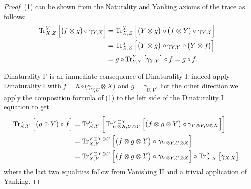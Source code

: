 \documentclass[12pt,oneside,article,draft]{memoir}
\begin{document}
\begin{proof}
 (1) can be shown from the Naturality and Yanking axioms of the trace as follows:
 \begin{align*}
  \operatorname{Tr}^Y_{X,Z}\Big[\big(f\otimes g\big)\circ\gamma_{Y,X}\Big]
  &=\operatorname{Tr}^Y_{X,Z}\Big[\big(Y\otimes g\big)\circ\big(f\otimes Y\big)\circ\gamma_{Y,X}\Big]\\
  &=\operatorname{Tr}^Y_{X,Z}\Big[\big(Y\otimes g\big)\circ\gamma_{Y,Y}\circ\big(Y\otimes f\big)\Big]\\
  &=g\circ\operatorname{Tr}^Y_{Y,Y}\big[\gamma_{Y,Y}\big]\circ f=g\circ f.
 \end{align*}
 
 Dinaturality I' is an immediate consequence of Dinaturality I, indeed apply Dinaturality I with $f=h\circ\big(\gamma_{V,U}\otimes X\big)$ and $g=\gamma_{U,V}$.  For the other direction we apply the composition formula of (1) to the left side of the Dinaturality I equation to get
 \begin{align*}
  \operatorname{Tr}^U_{X,Y}\Big[\big(g\otimes Y\big)\circ f\Big]
  &=\operatorname{Tr}^U_{X,Y}\bigg[\operatorname{Tr}^{V\otimes Y}_{U\otimes X,U\otimes Y}\Big[\big(f\otimes g\otimes Y\big)\circ\gamma_{V\otimes Y,U\otimes X}\Big]\bigg]\\
 &=\operatorname{Tr}^{V\otimes Y\otimes U}_{X,Y}\Big[\big(f\otimes g\otimes Y\big)\circ\gamma_{V\otimes Y,U\otimes X}\Big]\\
  &=\operatorname{Tr}^{V\otimes Y\otimes U}_{X,Y}\Big[\big(f\otimes g\otimes Y\big)\circ\gamma_{V\otimes Y,U\otimes X}\Big]\circ\operatorname{Tr}^X_{X,X}\big[\gamma_{X,X}\big],
 \end{align*}
 where the last two equalities follow from Vanishing II and a trivial application of Yanking.  
 

\end{proof}
\end{document}
